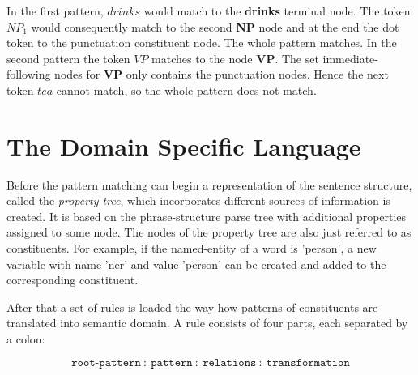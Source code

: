 \documentclass[english]{article}
\begin{document}
In the first pattern, $drinks$ would match to the \textbf{drinks} terminal node. The token $NP_1$ would consequently match to the second \textbf{NP} node and at the end the dot token to the punctuation constituent node. The whole pattern matches. In the second pattern the token $VP$ matches to the node \textbf{VP}. The set immediate-following nodes for \textbf{VP} only contains the punctuation nodes. Hence the next token $tea$ cannot match, so the whole pattern does not match.


\section{The Domain Specific Language}

Before the pattern matching can begin a representation of the sentence structure, called the \textit{property tree}, which incorporates different sources of information is created. It is based on the phrase-structure parse tree with additional properties assigned to some node. The nodes of the property tree are also just referred to as constituents. For example, if the named-entity of a word is 'person', a new variable with name 'ner' and value 'person' can be created and added to the corresponding constituent.

After that a set of rules is loaded the way how patterns of constituents are translated into semantic domain. A rule consists of four parts, each separated by a colon: 

\[ \mathtt{root\text{-}pattern\ :\ pattern\ :\ relations\ :\ transformation} \] 
\end{document}
